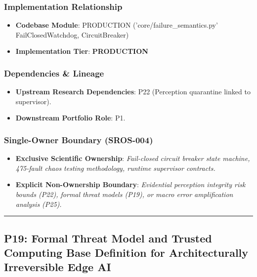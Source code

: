 \documentclass[11pt,letterpaper]{article}
\begin{document}
\subsubsection{Implementation Relationship}
\begin{itemize}[leftmargin=*]
    \item \raggedright \textbf{Codebase Module}: PRODUCTION ('core/\allowbreak failure\_\allowbreak semantics.py' FailClosedWatchdog, CircuitBreaker)
    \item \textbf{Implementation Tier}: \textbf{PRODUCTION}
\end{itemize}

\subsubsection{Dependencies \& Lineage}
\begin{itemize}[leftmargin=*]
    \item \textbf{Upstream Research Dependencies}: P22 (Perception quarantine linked to supervisor).
    \item \textbf{Downstream Portfolio Role}: P1.
\end{itemize}

\subsubsection{Single-Owner Boundary (SROS-004)}
\begin{itemize}[leftmargin=*]
    \item \textbf{Exclusive Scientific Ownership}: \textit{Fail-\allowbreak closed circuit breaker state machine, 475-\allowbreak fault chaos testing methodology, runtime supervisor contracts.}
    \item \textbf{Explicit Non-Ownership Boundary}: \textit{Evidential perception integrity risk bounds (P22), formal threat models (P19), or macro error amplification analysis (P25).}
\end{itemize}

\vspace{0.4cm}
\hrule

\subsection{P19: Formal Threat Model and Trusted Computing Base Definition for Architecturally Irreversible Edge AI}
\label{sec:profile_p19}
\end{document}
